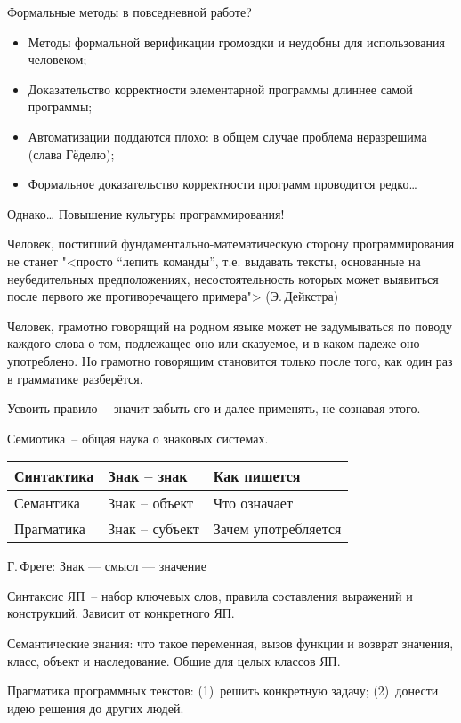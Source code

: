 \documentclass[landscape]{slides}
\begin{document}
\begin{slide}
Формальные методы в повседневной работе?
\begin{itemize}
\item Методы формальной верификации громоздки и неудобны для использования
        человеком;
\item Доказательство корректности элементарной программы
        длиннее самой программы;
\item Автоматизации поддаются плохо: в общем случае проблема
        неразрешима (слава Гёделю);
\item Формальное доказательство корректности программ проводится редко\ldots
\end{itemize}
\end{slide}

\begin{slide}
Однако\ldots
Повышение культуры программирования!

Человек, постигший фундаментально-математическую сторону программирования
не станет
"<просто ``лепить команды'', т.е. выдавать тексты, основанные на неубедительных
предположениях, несостоятельность которых может выявиться после первого же
противоречащего примера"> (Э.\,Дейкстра)

Человек, грамотно говорящий на родном языке может не задумываться по поводу
каждого слова о том, подлежащее оно или сказуемое, и в каком падеже оно
употреблено. Но грамотно говорящим становится только после того, как один раз
в грамматике разберётся.

Усвоить правило~-- значит забыть его и далее применять, не сознавая этого.
\end{slide}

\begin{slide}
Семиотика~-- общая наука о знаковых системах.

\begin{center}
\begin{tabular}{|l|l|l|}
        \hline
        Синтактика & Знак -- знак    & Как пишется         \\ \hline
        Семантика  & Знак -- объект  & Что означает        \\ \hline
        Прагматика & Знак -- субъект & Зачем употребляется \\ \hline
\end{tabular}
\end{center}

Г.\,Фреге: Знак --- смысл --- значение

Синтаксис ЯП~-- набор ключевых слов, правила составления выражений и
конструкций. Зависит от конкретного ЯП.

Семантические знания: что такое переменная, вызов функции и возврат
значения, класс, объект и наследование. Общие для целых классов ЯП.

Прагматика программных текстов: (1)~решить конкретную задачу;
(2)~донести идею решения до других людей.
\end{slide}
\end{document}
